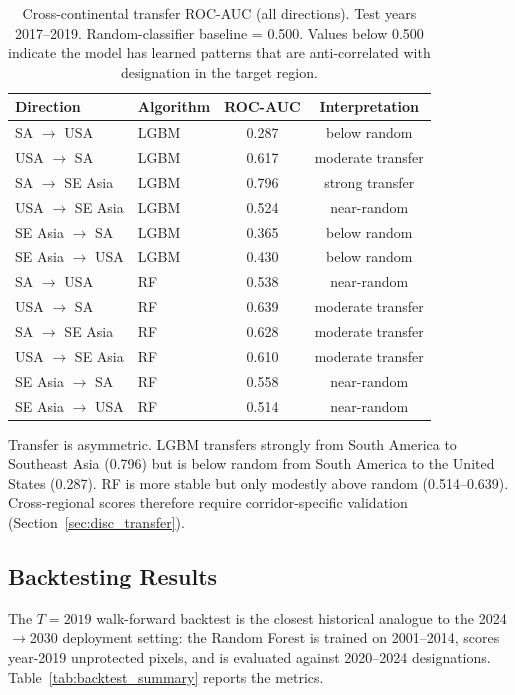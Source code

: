 \documentclass[12pt]{article}
\theoremstyle{break}
\begin{document}
\begin{appendices}
\begin{table}[!htbp]
\centering
\caption{Cross-continental transfer ROC-AUC (all directions). Test years 2017--2019.
Random-classifier baseline = 0.500. Values below 0.500 indicate the model has
learned patterns that are anti-correlated with designation in the target region.}
\label{tab:transfer_full}
\small
\begin{tabular}{llcc}
\toprule
\textbf{Direction} & \textbf{Algorithm} & \textbf{ROC-AUC} & \textbf{Interpretation} \\
\midrule
SA $\to$ USA         & LGBM & 0.287 & below random \\
USA $\to$ SA         & LGBM & 0.617 & moderate transfer \\
SA $\to$ SE Asia     & LGBM & 0.796 & strong transfer \\
USA $\to$ SE Asia    & LGBM & 0.524 & near-random \\
SE Asia $\to$ SA     & LGBM & 0.365 & below random \\
SE Asia $\to$ USA    & LGBM & 0.430 & below random \\
\midrule
SA $\to$ USA         & RF   & 0.538 & near-random \\
USA $\to$ SA         & RF   & 0.639 & moderate transfer \\
SA $\to$ SE Asia     & RF   & 0.628 & moderate transfer \\
USA $\to$ SE Asia    & RF   & 0.610 & moderate transfer \\
SE Asia $\to$ SA     & RF   & 0.558 & near-random \\
SE Asia $\to$ USA    & RF   & 0.514 & near-random \\
\bottomrule
\end{tabular}
\end{table}

Transfer is asymmetric. LGBM transfers strongly from South America to Southeast Asia
(0.796) but is below random from South America to the United States (0.287). RF is
more stable but only modestly above random (0.514--0.639). Cross-regional scores
therefore require corridor-specific validation (Section~\ref{sec:disc_transfer}).

\subsection{Backtesting Results}
\label{app:backtest}

The $T=2019$ walk-forward backtest is the closest historical analogue to the
2024$\rightarrow$2030 deployment setting: the Random Forest is trained on 2001--2014,
scores year-2019 unprotected pixels, and is evaluated against 2020--2024
designations. Table~\ref{tab:backtest_summary} reports the metrics.


\end{appendices}
\end{document}
